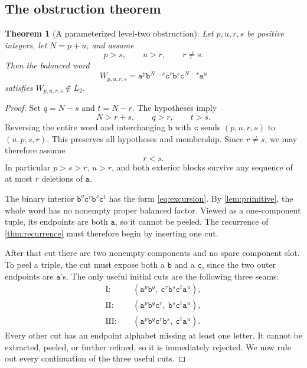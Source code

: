 \documentclass[11pt,letterpaper]{article}
\numberwithin{equation}{section}
\newtheorem{theorem}{Theorem}[section]
\theoremstyle{definition}
\theoremstyle{remark}
\renewcommand{\aa}{\mathtt a}
\newcommand{\bb}{\mathtt b}
\newcommand{\cc}{\mathtt c}
\begin{document}
\subsection{The obstruction theorem}
\begin{theorem}[A parameterized level-two obstruction]
\label{thm:cone}
Let \(p,u,r,s\) be positive integers, let \(N=p+u\), and assume
\[
  p>s,\qquad u>r,\qquad r\ne s.
\]
Then the balanced word
\begin{equation}\label{eq:W}
 W_{p,u,r,s}
   =\aa^p\bb^{N-s}\cc^r\bb^s\cc^{N-r}\aa^u
\end{equation}
satisfies \(W_{p,u,r,s}\notin L_2\).
\end{theorem}
\begin{proof}
Set \(q=N-s\) and \(t=N-r\). The hypotheses imply
\[
  N>r+s,\qquad q>r,\qquad t>s.
\]
Reversing the entire word and interchanging \(\bb\) with \(\cc\)
sends \((p,u,r,s)\) to \((u,p,s,r)\). This preserves all hypotheses
and membership. Since \(r\ne s\), we may therefore assume
\begin{equation}\label{eq:assume}
 r<s.
\end{equation}
In particular \(p>s>r\), \(u>r\), and both exterior blocks survive
any sequence of at most \(r\) deletions of \(\aa\).

The binary interior \(\bb^q\cc^r\bb^s\cc^t\) has the form
\eqref{eq:excursion}. By \cref{lem:primitive}, the whole word has no
nonempty proper balanced factor. Viewed as a one-component tuple,
its endpoints are both \(\aa\), so it cannot be peeled. The recurrence
of \cref{thm:recurrence} must therefore begin by inserting one cut.

After that cut there are two nonempty components and no spare component
slot. To peel a triple, the cut must expose both a \(\bb\) and a
\(\cc\), since the two outer endpoints are \(\aa\)'s. The only useful
initial cuts are the following three seams:
\begin{align*}
 \mathrm{I}:&\quad
 (\aa^p\bb^q,\ \cc^r\bb^s\cc^t\aa^u),\\
 \mathrm{II}:&\quad
 (\aa^p\bb^q\cc^r,\ \bb^s\cc^t\aa^u),\\
 \mathrm{III}:&\quad
 (\aa^p\bb^q\cc^r\bb^s,\ \cc^t\aa^u).
\end{align*}
Every other cut has an endpoint alphabet missing at least one letter.
It cannot be extracted, peeled, or further refined, so it is immediately
rejected. We now rule out every continuation of the three useful cuts.


\end{proof}
\end{document}

